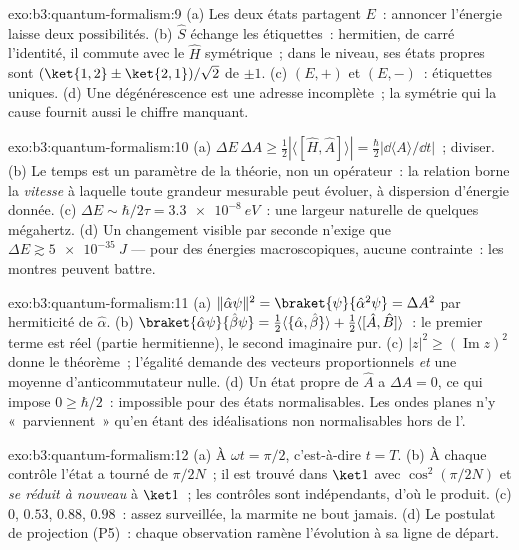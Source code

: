 \begin{solution}{exo:b3:quantum-formalism:9}
(a) Les deux états partagent $E$~: annoncer l'énergie laisse deux
possibilités. (b) $\hat S$ échange les étiquettes~: hermitien, de
carré l'identité, il commute avec le $\hat H$ symétrique~; dans le
niveau, ses états propres sont $(\ket{1,2} \pm \ket{2,1})/\sqrt2$ de 
$\pm1$. (c) $(E, +)$ et $(E, -)$~: étiquettes uniques. (d) Une
dégénérescence est une adresse incomplète~; la symétrie qui la cause
fournit aussi le chiffre manquant.
\end{solution}

\begin{solution}{exo:b3:quantum-formalism:10}
(a) $\Delta E\,\Delta A \ge \tfrac12|\langle[\hat H, \hat
A]\rangle| = \tfrac\hbar2|\dd\langle A\rangle/\dd t|$~; diviser. (b)
Le temps est un paramètre de la théorie, non un opérateur~: la
relation borne la \emph{vitesse} à laquelle toute grandeur mesurable
peut évoluer, à dispersion d'énergie donnée. (c) $\Delta E \sim \hbar/2\tau = \qty{3.3e-8}{eV}$~:
une largeur naturelle de quelques mégahertz. (d) Un changement
visible par seconde n'exige que $\Delta E \gtrsim \qty{5e-35}{J}$ ---
pour des énergies macroscopiques, aucune contrainte~: les montres
peuvent battre.
\end{solution}

\begin{solution}{exo:b3:quantum-formalism:11}
(a) $\|\hat\alpha\psi\|^2 = \braket{\psi}{\hat\alpha^2\psi} =
\Delta A^2$ par hermiticité de $\hat\alpha$. (b) $\braket{\hat\alpha
\psi}{\hat\beta\psi} = \tfrac12\langle\{\hat\alpha,
\hat\beta\}\rangle + \tfrac12\langle[\hat A, \hat B]\rangle$~: le
premier terme est réel (partie hermitienne), le second imaginaire
pur. (c) $|z|^2 \ge (\operatorname{Im}z)^2$ donne le théorème~;
l'égalité demande des vecteurs proportionnels \emph{et} une moyenne
d'anticommutateur nulle. (d) Un état propre de $\hat A$ a
$\Delta A = 0$, ce qui impose $0 \ge \hbar/2$~: impossible pour des
états normalisables. Les ondes planes n'y «~parviennent~» qu'en étant
des idéalisations non normalisables hors de l'.
\end{solution}

\begin{solution}{exo:b3:quantum-formalism:12}
(a) À $\omega t = \pi/2$, c'est-à-dire $t = T$. (b) À chaque contrôle
l'état a tourné de $\pi/2N$~; il est trouvé dans $\ket1$ avec
$\cos^2(\pi/2N)$ et \emph{se réduit à nouveau} à $\ket1$~; les
contrôles sont indépendants, d'où le produit. (c) $0$, $0.53$,
$0.88$, $0.98$~: assez surveillée, la marmite ne bout jamais. (d) Le
postulat de projection (P5)~: chaque observation ramène l'évolution à
sa ligne de départ.
\end{solution}

